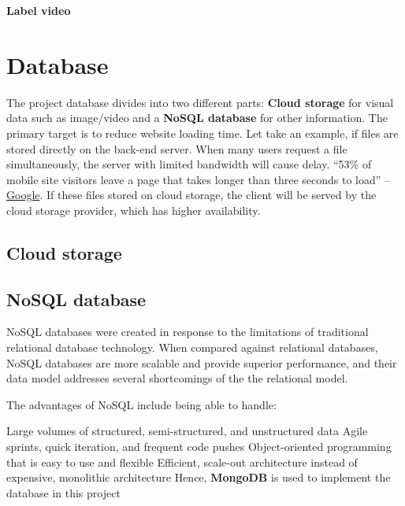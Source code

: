 \textbf{Label video}

\section{Database}
The project database divides into two different parts: \textbf{Cloud storage} for visual data such as image/video and a \textbf{NoSQL database} for other information. The primary target is to reduce website loading time. Let take an example, if files are stored directly on the back-end server. When many users request a file simultaneously, the server with limited bandwidth will cause delay. “53\% of mobile site visitors leave a page that takes longer than three seconds to load” – \href{https://think.storage.googleapis.com/docs/mobile-page-speed-new-industry-benchmarks.pdf}{Google}. If these files stored on cloud storage, the client will be served by the cloud storage provider, which has higher availability.
\subsection{Cloud storage}

\subsection{NoSQL database}
NoSQL databases were created in response to the limitations of traditional relational database technology. When compared against relational databases, NoSQL databases are more scalable and provide superior performance, and their data model addresses several shortcomings of the the relational model.

The advantages of NoSQL include being able to handle:

Large volumes of structured, semi-structured, and unstructured data
Agile sprints, quick iteration, and frequent code pushes
Object-oriented programming that is easy to use and flexible
Efficient, scale-out architecture instead of expensive, monolithic architecture
Hence, \textbf{MongoDB} is used to implement the database in this project
